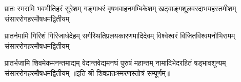 
\fourlineindentedshloka
{प्रातः स्मरामि भवभीतिहरं सुरेशम्}
{गङ्गाधरं वृषभवाहनमम्बिकेशम्‌}
{खट्वाङ्गशूलवरदाभयहस्तमीशम्}
{संसाररोगहरमौषधमद्वितीयम्‌}

\fourlineindentedshloka
{प्रातर्नमामि गिरिशं गिरिजार्धदेहम्}
{सर्गस्थितिप्रलयकारणमादिदेवम्‌}
{विश्वेश्वरं विजितविश्वमनोभिरामम्}
{संसाररोगहरमौषधमद्वितीयम्‌}

\fourlineindentedshloka
{प्रातर्भजामि शिवमेकमनन्तमाद्यम्}
{वेदान्तवेद्यमनघं पुरुषं महान्तम्‌}
{नामादिभेदरहितं षड्भावशून्यम्}
{संसाररोगहरमौषधमद्वितीयम्‌}
॥इति श्री शिवप्रातःस्मरणस्तोत्रं सम्पूर्णम्॥